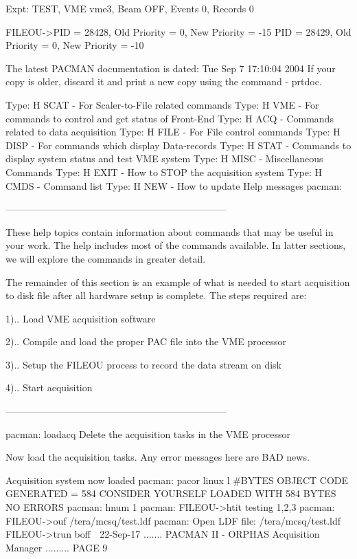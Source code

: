     Expt: TEST, VME vme3, Beam OFF, Events            0, Records 0
 
   FILEOU->PID = 28428, Old Priority = 0, New Priority = -15
   PID = 28429, Old Priority = 0, New Priority = -10
 
   The latest PACMAN documentation is dated: Tue Sep  7 17:10:04 2004
   If your copy is older, discard it and print a new copy using the
   command -  prtdoc.
 
   Type: H SCAT - For Scaler-to-File related commands
   Type: H VME  - For commands to control and get status of Front-End
   Type: H ACQ  - Commands related to data acquisition
   Type: H FILE - For File control commands
   Type: H DISP - For commands which display Data-records
   Type: H STAT - Commands to display system status and test VME system
   Type: H MISC - Miscellaneous Commands
   Type: H EXIT - How to STOP the acquisition system
   Type: H CMDS - Command list
   Type: H NEW  - How to update Help messages
   pacman:
 
     ---------------------------------------------------------------------
 
   These  help topics contain information about commands that may be useful in
   your work. The help includes most of  the  commands  available.  In  latter
   sections, we will explore the commands in greater detail.
 
   The  remainder  of  this  section  is an example of what is needed to start
   acquisition to disk file after all hardware setup is  complete.  The  steps
   required are:
 
          1).. Load VME acquisition software
 
          2).. Compile and load the proper PAC file into the VME processor
 
          3).. Setup the FILEOU process to record the data stream on disk
 
          4).. Start acquisition
 
     ---------------------------------------------------------------------
 
   pacman: loadacq
   Delete the acquisition tasks in the VME processor
 
   Now load the acquisition tasks.  Any error messages here are BAD news.
 
   Acquisition system now loaded
   pacman: pacor linux l
    #BYTES OBJECT CODE GENERATED =     584
    CONSIDER YOURSELF LOADED WITH    584  BYTES
    NO ERRORS
   pacman: hnum 1
   pacman: FILEOU->htit testing 1,2,3
   pacman: FILEOU->ouf /tera/mcsq/test.ldf
   pacman:  Open LDF file: /tera/mcsq/test.ldf
   FILEOU->trun boff
    
   22-Sep-17 ....... PACMAN II - ORPHAS Acquisition Manager ......... PAGE   9
 
